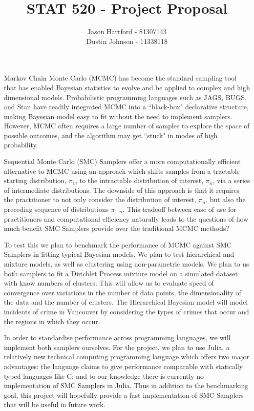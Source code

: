 \documentclass[11pt, oneside]{amsart}
\title{STAT 520 - Project Proposal}
\author{Jason Hartford - 81307143 \\
Dustin Johnson - 11338118}
\begin{document}
\maketitle



Markov Chain Monte Carlo (MCMC) has become the standard sampling tool that has enabled Bayesian statistics to evolve and be applied to complex and high dimensional models. Probabilistic programming languages such as JAGS, BUGS, and Stan have readily integrated MCMC into a ``black-box" declarative structure, making Bayesian model easy to fit without the need to implement samplers. However, MCMC often requires a large number of samples to explore the space of possible outcomes, and the algorithm may get ``stuck" in modes of high probability.

Sequential Monte Carlo (SMC) Samplers \cite{DelMoral2005} offer a more computationally efficient alternative to MCMC using an approach which shifts samples from a tractable starting distribution, $\pi_1$, to the intractable distribution of interest, $\pi_n$, via a series of intermediate distributions. The downside of this approach is that it requires the practitioner to not only consider the distribution of interest, $\pi_n$, but also the preceding sequence of distributions $\pi_{1:n}$. This tradeoff between ease of use for practitioners and computational efficiency naturally leads to the questions of how much benefit  SMC Samplers provide over the traditional MCMC methods?

To test this we plan to benchmark the performance of MCMC against SMC Samplers in fitting typical Bayesian models. We plan to test hierarchical and mixture models, as well as clustering using non-parametric models.  We plan to us both samplers to fit a Dirichlet Process mixture model on a simulated dataset with know numbers of clusters. This will allow us to evaluate speed of convergence over variations in the number of data points, the dimensionality of the data and the number of clusters. The Hierarchical Bayesian model will model incidents of crime in Vancouver by considering the types of crimes that occur and the regions in which they occur.

In order to standardise performance across programming languages, we will implement both samplers ourselves. For the project, we plan to use Julia, a relatively new technical computing programming language which offers two major advantages: the language claims to give performance comparable with statically typed languages like C; and to our knowledge there is currently no implementation of SMC Samplers in Julia. Thus in addition to the benchmarking goal, this project will hopefully provide a fast implementation of SMC Samplers that will be useful in future work.
\end{document}
